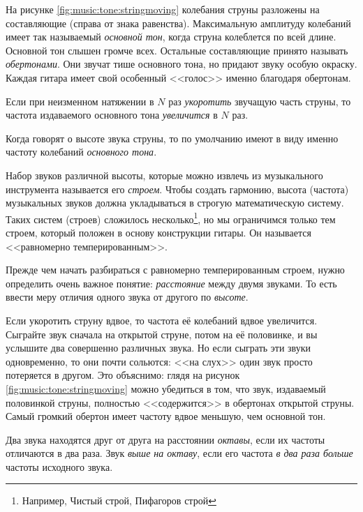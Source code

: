 На рисунке \ref{fig:music:tone:stringmoving} колебания струны разложены на составляющие (справа от знака равенства). Максимальную амплитуду колебаний имеет так называемый \emph{основной тон}, когда струна колеблется по всей длине. Основной тон слышен громче всех. Остальные составляющие принято называть \emph{обертонами}. Они звучат тише основного тона, но придают звуку особую окраску. Каждая гитара имеет свой особенный <<голос>> именно благодаря обертонам.

\begin{Definition}
    Если при неизменном натяжении в $N$ раз \emph{укоротить} звучащую часть струны, то частота издаваемого основного тона \emph{увеличится} в $N$ раз.
\end{Definition}

Когда говорят о высоте звука струны, то по умолчанию имеют в виду именно частоту колебаний \emph{основного тона}.

Набор звуков различной высоты, которые можно извлечь из музыкального инструмента называется его \emph{строем}. Чтобы создать гармонию, высота (частота) музыкальных звуков должна укладываться в строгую математическую систему. Таких систем (строев) сложилось несколько\footnote{Например, Чистый строй, Пифагоров строй}, но мы ограничимся только тем строем, который положен в основу конструкции гитары. Он называется <<равномерно темперированным>>.

Прежде чем начать разбираться с равномерно темперированным строем, нужно определить очень важное понятие: \emph{расстояние} между двумя звуками. То есть ввести меру отличия одного звука от другого по \emph{высоте}. 

Если укоротить струну вдвое, то частота её колебаний вдвое увеличится. Сыграйте звук сначала на открытой струне, потом на её половинке, и вы услышите два совершенно различных звука. Но если сыграть эти звуки одновременно, то они почти сольются: <<на слух>> один звук просто потеряется в другом. Это объяснимо: глядя на рисунок \ref{fig:music:tone:stringmoving} можно убедиться в том, что звук, издаваемый половинкой струны, полностью <<содержится>> в обертонах открытой струны. Самый громкий обертон имеет частоту вдвое меньшую, чем основной тон.

\begin{Definition}[Октава]
    Два звука находятся друг от друга на расстоянии \emph{октавы}, если их частоты отличаются в два раза. Звук \emph{выше на октаву}, если его частота \emph{в два раза больше} частоты исходного звука. 
\end{Definition}

